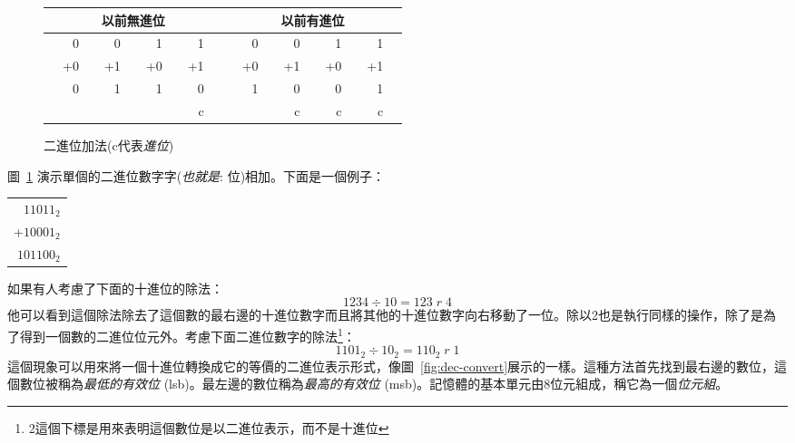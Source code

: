 \begin{figure}[h]
\begin{center}
\begin{tabular}{|rrrrrrrrp{.1cm}|p{.1cm}rrrrrrrr|}
\hline
& \multicolumn{7}{c}{以前無進位} & & & \multicolumn{7}{c}{以前有進位} & \\
\hline
&  0 & &  0 & &  1 & &  1 & & &  0 & &  0 & &  1 & & 1  & \\
& +0 & & +1 & & +0 & & +1 & & & +0 & & +1 & & +0 & & +1 &  \\
\cline{2-2} \cline{4-4} \cline{6-6} \cline{8-8} \cline{11-11} \cline{13-13} \cline{15-15} \cline{17-17}
& 0  & & 1  & & 1  & & 0  & & & 1  & & 0  & & 0  & & 1 & \\
&    & &    & &    & & c  & & &    & & c  & & c  & & c & \\
\hline
\end{tabular}

\caption{二進位加法(c代表\emph{進位})\label{fig:bin-add}}
\end{center}
\end{figure}

圖~\ref{fig:bin-add} 演示單個的二進位數字字({\em 也就是}:
位)相加。下面是一個例子：

\begin{tabular}{r}
 $11011_2$ \\
+$10001_2$ \\
\hline
$101100_2$ \\
\end{tabular}

如果有人考慮了下面的十進位的除法：
\[ 1234 \div 10 = 123\; r\; 4 \]
他可以看到這個除法除去了這個數的最右邊的十進位數字而且將其他的十進位數字向右移動了一位。除以2也是執行同樣的操作，除了是為了得到一個數的二進位位元外。考慮下面二進位數字的除法\footnote{2這個下標是用來表明這個數位是以二進位表示，而不是十進位
}：
\[ 1101_2 \div 10_2 = 110_2\; r\; 1 \]
這個現象可以用來將一個十進位轉換成它的等價的二進位表示形式，像圖~\ref{fig:dec-convert}展示的一樣。這種方法首先找到最右邊的數位，這個數位被稱為\emph{最低的有效位}
(lsb)。最左邊的數位稱為\emph{最高的有效位}
(msb)。記憶體的基本單元由8位元組成，稱它為一個\emph{位元組}。

